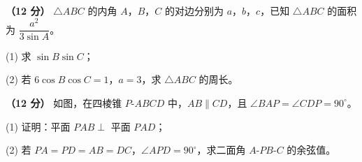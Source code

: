 \begin{question}
\textbf{（12 分）} $\triangle ABC$ 的内角 $A$，$B$，$C$ 的对边分别为 $a$，$b$，$c$，已知 $\triangle ABC$ 的面积为 $\dfrac{a^{2}}{3\sin A}$。

  (1) 求 $\sin B\sin C$；

  (2) 若 $6\cos B\cos C=1$，$a=3$，求 $\triangle ABC$ 的周长。

\Needspace{0.4\textheight}
\end{question}
\begin{question}
\textbf{（12 分）} 如图，在四棱锥 $P\text{-}ABCD$ 中，$AB\parallel CD$，且 $\angle BAP=\angle CDP=90^\circ$。
\nopagebreak[4]
\begin{center}\end{center}
\nopagebreak[4]
  (1) 证明：平面 $PAB\perp$ 平面 $PAD$；

  (2) 若 $PA=PD=AB=DC$，$\angle APD=90^\circ$，求二面角 $A\text{-}PB\text{-}C$ 的余弦值。

\end{question}
